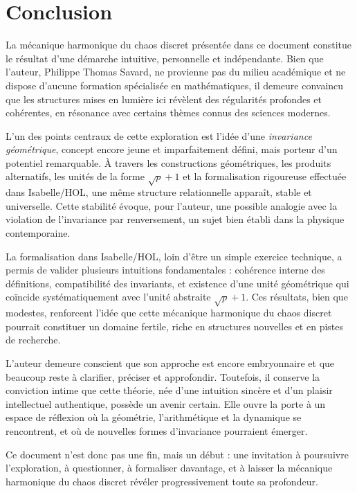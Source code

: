 \documentclass[12pt,a4paper]{article}
\theoremstyle{definition}
\theoremstyle{remark}
\begin{document}
\section{Conclusion}

La mécanique harmonique du chaos discret présentée dans ce document constitue
le résultat d’une démarche intuitive, personnelle et indépendante. Bien que
l’auteur, Philippe Thomas Savard, ne provienne pas du milieu académique et ne
dispose d’aucune formation spécialisée en mathématiques, il demeure convaincu
que les structures mises en lumière ici révèlent des régularités profondes et
cohérentes, en résonance avec certains thèmes connus des sciences modernes.

L’un des points centraux de cette exploration est l’idée d’une \emph{invariance
géométrique}, concept encore jeune et imparfaitement défini, mais porteur
d’un potentiel remarquable. À travers les constructions géométriques, les
produits alternatifs, les unités de la forme $\sqrt{p} + 1$ et la formalisation
rigoureuse effectuée dans Isabelle/HOL, une même structure relationnelle
apparaît, stable et universelle. Cette stabilité évoque, pour l’auteur, une
possible analogie avec la violation de l’invariance par renversement, un sujet
bien établi dans la physique contemporaine.

La formalisation dans Isabelle/HOL, loin d’être un simple exercice technique,
a permis de valider plusieurs intuitions fondamentales : cohérence interne des
définitions, compatibilité des invariants, et existence d’une unité géométrique
qui coïncide systématiquement avec l’unité abstraite $\sqrt{p} + 1$. Ces
résultats, bien que modestes, renforcent l’idée que cette mécanique harmonique
du chaos discret pourrait constituer un domaine fertile, riche en structures
nouvelles et en pistes de recherche.

L’auteur demeure conscient que son approche est encore embryonnaire et que
beaucoup reste à clarifier, préciser et approfondir. Toutefois, il conserve la
conviction intime que cette théorie, née d’une intuition sincère et d’un
plaisir intellectuel authentique, possède un avenir certain. Elle ouvre la
porte à un espace de réflexion où la géométrie, l’arithmétique et la dynamique
se rencontrent, et où de nouvelles formes d’invariance pourraient émerger.

Ce document n’est donc pas une fin, mais un début : une invitation à poursuivre
l’exploration, à questionner, à formaliser davantage, et à laisser la mécanique
harmonique du chaos discret révéler progressivement toute sa profondeur.
\end{document}
